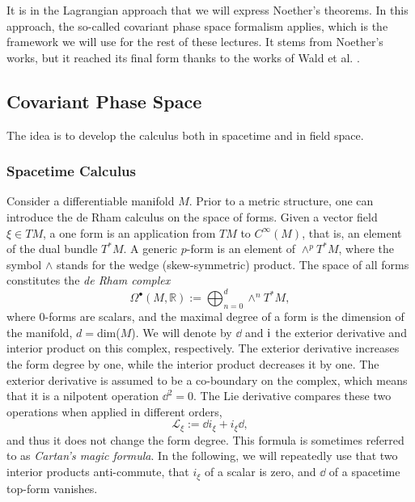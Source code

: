  It is in the Lagrangian approach that we will express Noether’s theorems. In this approach, the so-called covariant phase space formalism applies, which is the framework we will use for the rest of these lectures. It stems from Noether’s works, but it reached its final form thanks to the works of Wald et al. \cite{Lee:1990nz,Wald:1993nt,Iyer:1994ys,Iyer:1995kg,Wald:1999wa}.
 
 \subsection{Covariant Phase Space}
 The idea is to develop the calculus both in spacetime and in field space.
 
\subsubsection*{Spacetime Calculus} Consider a differentiable manifold $M$. Prior to a metric structure, one can introduce the de Rham calculus on the space of forms. Given a vector field $\xi\in TM$, a one form is an application from $TM$ to $C^\infty(M)$, that is, an element of the dual bundle $T^*M$. A generic $p$-form is an element of $\wedge^pT^*M$, where the symbol $\wedge$ stands for the wedge (skew-symmetric) product. The space of all forms constitutes the \textit{de Rham complex}
\begin{equation}
	\Omega^\bullet(M,\mathbb{R}):=\bigoplus_{n=0}^d\wedge^n T^*M,
\end{equation}
where $0$-forms are scalars, and the maximal degree of a form is the dimension of the manifold, $d =$dim($M$). We will denote by $\dd $ and $\mathrm{i}$ the exterior derivative and interior product on this complex, respectively. The exterior derivative increases the form degree by one, while the interior product decreases it by one. The exterior derivative is assumed to be a co-boundary on the complex, which means that it is a nilpotent operation $\dd^2=0$. The Lie derivative compares these two operations when applied in different orders,
\begin{equation}
	\mathcal{L}_\xi:=\dd i_\xi + i_\xi\dd ,
\end{equation}
and thus it does not change the form degree. This formula is sometimes referred to as \textit{Cartan’s magic formula}. In the following, we will repeatedly use that two interior products anti-commute, that $i_\xi $ of a scalar is zero, and $\dd $ of a spacetime top-form vanishes.

